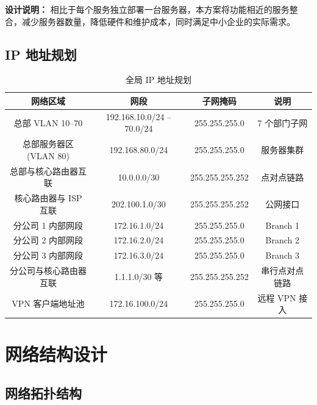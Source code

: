 \documentclass[12pt,a4paper]{ctexart}
\begin{document}
\textbf{设计说明：} 相比于每个服务独立部署一台服务器，本方案将功能相近的服务整合，减少服务器数量，降低硬件和维护成本，同时满足中小企业的实际需求。

\subsection{IP 地址规划}

\begin{table}[H]
\centering
\caption{全局 IP 地址规划}
\label{tab:ip}
\begin{tabular}{|c|c|c|c|}
\hline
\textbf{网络区域}        & \textbf{网段}              & \textbf{子网掩码}       & \textbf{说明}          \\ \hline
总部 VLAN 10--70         & 192.168.10.0/24 -- 70.0/24& 255.255.255.0           & 7 个部门子网           \\ \hline
总部服务器区 (VLAN 80)   & 192.168.80.0/24           & 255.255.255.0           & 服务器集群             \\ \hline
总部与核心路由器互联     & 10.0.0.0/30               & 255.255.255.252         & 点对点链路             \\ \hline
核心路由器与 ISP 互联    & 202.100.1.0/30            & 255.255.255.252         & 公网接口               \\ \hline
分公司 1 内部网段        & 172.16.1.0/24             & 255.255.255.0           & Branch 1               \\ \hline
分公司 2 内部网段        & 172.16.2.0/24             & 255.255.255.0           & Branch 2               \\ \hline
分公司 3 内部网段        & 172.16.3.0/24             & 255.255.255.0           & Branch 3               \\ \hline
分公司与核心路由器互联   & 1.1.1.0/30 等             & 255.255.255.252         & 串行点对点链路         \\ \hline
VPN 客户端地址池         & 172.16.100.0/24           & 255.255.255.0           & 远程 VPN 接入          \\ \hline
\end{tabular}
\end{table}

\section{网络结构设计}

\subsection{网络拓扑结构}
\end{document}

